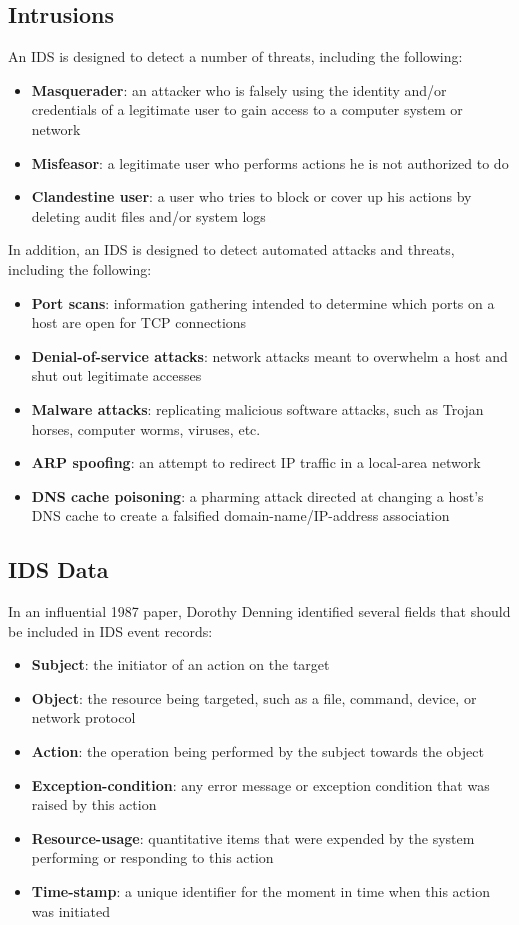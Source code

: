 \subsection{Intrusions}
An IDS is designed to detect a number of threats, including the following:
\begin{itemize}
\item \textbf{Masquerader}: an attacker who is falsely using the identity and/or credentials of a legitimate user to gain access to a computer system or network
\item \textbf{Misfeasor}: a legitimate user who performs actions he is not authorized to do 
\item \textbf{Clandestine user}: a user who tries to block or cover up his actions by deleting audit files and/or system logs
\end{itemize}
In addition, an IDS is designed to detect automated attacks and threats, including the following:
\begin{itemize}
\item \textbf{Port scans}: information gathering intended to determine which ports on a host are open for TCP connections
\item \textbf{Denial-of-service attacks}: network attacks meant to overwhelm a host and shut out legitimate accesses
\item \textbf{Malware attacks}: replicating malicious software attacks, such as Trojan horses, computer worms, viruses, etc.
\item \textbf{ARP spoofing}: an attempt to redirect IP traffic in a local-area network
\item \textbf{DNS cache poisoning}: a pharming attack directed at changing a host’s DNS cache to create a falsified domain-name/IP-address association
\end{itemize}
\subsection{IDS Data} 
In an influential 1987 paper, Dorothy Denning identified several fields that should be included in IDS event records:
\begin{itemize}
\item \textbf{Subject}: the initiator of an action on the target
\item \textbf{Object}: the resource being targeted, such as a file, command, device, or network protocol
\item \textbf{Action}: the operation being performed by the subject towards the object
\item \textbf{Exception-condition}: any error message or exception condition that was raised by this action
\item \textbf{Resource-usage}: quantitative items that were expended by the system performing or responding to this action
\item \textbf{Time-stamp}: a unique identifier for the moment in time when this action was initiated
\end{itemize}
